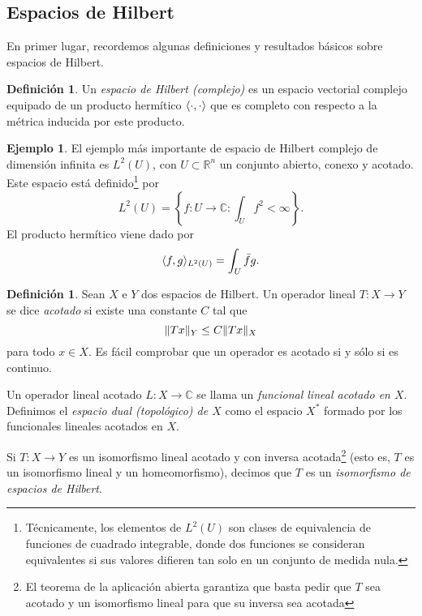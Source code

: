 \documentclass[12pt,a4paper]{article}
\theoremstyle{definition} \newtheorem{defn}[thm]{Definición}
\theoremstyle{definition} \newtheorem{ejemplo}[thm]{Ejemplo}
\theoremstyle{definition} \newtheorem{ejercicio}[thm]{Ejercicio}
\theoremstyle{remark} \newtheorem*{obs}{Observación}
\DeclarePairedDelimiter\norm{\lVert}{\rVert}
\DeclarePairedDelimiter\esc{\langle}{\rangle}
\newcommand{\RR}{\mathbb{R}}
\newcommand{\CC}{\mathbb{C}}
\begin{document}
 \subsection{Espacios de Hilbert}
 En primer lugar, recordemos algunas definiciones y resultados básicos sobre espacios de Hilbert.
 \begin{defn}
   Un \emph{espacio de Hilbert (complejo)}  es un espacio vectorial complejo equipado de un producto hermítico $\esc{\cdot,\cdot}$ que es completo con respecto a la métrica inducida por este producto.
 \end{defn}
 \begin{ejemplo}
   El ejemplo más importante de espacio de Hilbert complejo de dimensión infinita es $L^2(U)$, con $U\subset \RR^n$ un conjunto abierto, conexo y acotado. Este espacio está definido\footnote{Técnicamente, los elementos de $L^2(U)$ son clases de equivalencia de funciones de cuadrado integrable, donde dos funciones se consideran equivalentes si sus valores difieren tan solo en un conjunto de medida nula.} por
   \begin{equation*}
     L^2(U)= \left\{ f:U \rightarrow \CC : \int_U f^2 < \infty \right\}.
   \end{equation*}
   El producto hermítico viene dado por
   \begin{equation*}
     \esc{f,g}_{L^2(U)}=\int_U \bar{f} g.
   \end{equation*}
 \end{ejemplo}
 \begin{defn}
   Sean $X$ e $Y$ dos espacios de Hilbert. Un operador lineal $T:X\rightarrow Y$ se dice \emph{acotado} si existe una constante $C$ tal que
   \begin{equation*}
     \norm{Tx}_Y \leq C \norm{Tx}_X
   \end{equation*}
   para todo $x\in X$. Es fácil comprobar que un operador es acotado si y sólo si es continuo.

   Un operador lineal acotado $L:X\rightarrow \CC$ se llama un \emph{funcional lineal acotado en $X$}. Definimos el \emph{espacio dual (topológico) de $X$} como el espacio $X^*$ formado por los funcionales lineales acotados en $X$. 

   Si $T:X\rightarrow Y$ es un isomorfismo lineal acotado y con inversa acotada\footnote{El teorema de la aplicación abierta garantiza que basta pedir que $T$ sea acotado y un isomorfismo lineal para que su inversa sea acotada} (esto es, $T$ es un isomorfismo lineal y un homeomorfismo), decimos que $T$ es un \emph{isomorfismo de espacios de Hilbert}.
 \end{defn}
\end{document}
